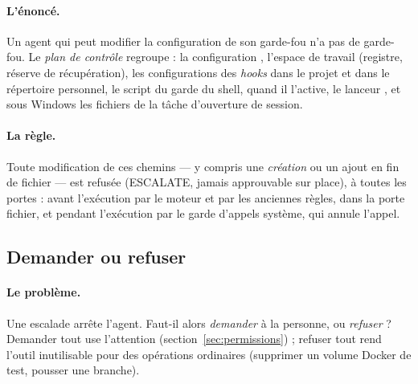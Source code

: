 \paragraph{L'énoncé.} Un agent qui peut modifier la configuration de son garde-fou n'a pas de
garde-fou. Le \emph{plan de contrôle} regroupe : la configuration ,
l'espace de travail  (registre, réserve de récupération), les
configurations des \textit{hooks} dans le projet et dans le répertoire personnel, le script du
garde du shell,  quand il l'active, le lanceur
, et sous Windows les fichiers de la tâche d'ouverture de session.

\paragraph{La règle.} Toute modification de ces chemins --- y compris une \emph{création} ou un
ajout en fin de fichier --- est refusée (ESCALATE, jamais approuvable sur place), à toutes les
portes : avant l'exécution par le moteur et par les anciennes règles, dans la porte fichier,
et pendant l'exécution par le garde d'appels système, qui annule l'appel.


\subsection{Demander ou refuser}
\label{sec:ask-deny}

\paragraph{Le problème.} Une escalade arrête l'agent. Faut-il alors \emph{demander} à la
personne, ou \emph{refuser} ? Demander tout use l'attention (section~\ref{sec:permissions}) ;
refuser tout rend l'outil inutilisable pour des opérations ordinaires (supprimer un volume
Docker de test, pousser une branche).

